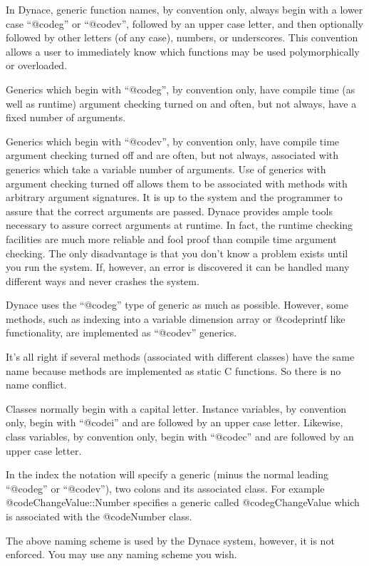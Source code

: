 In Dynace, generic function names, by convention only, always begin with
a lower case ``@code{g}'' or ``@code{v}'', followed by an upper case
letter, and then optionally followed by other letters (of any case),
numbers, or underscores.  This convention allows a user to immediately
know which functions may be used polymorphically or overloaded.

Generics which begin with ``@code{g}'', by convention only, have compile
time (as well as runtime) argument checking turned on and often, but not
always, have a fixed number of arguments.

Generics which begin with ``@code{v}'', by convention only, have compile
time argument checking turned off and are often, but not always,
associated with generics which take a variable number of arguments.  Use
of generics with argument checking turned off allows them to be
associated with methods with arbitrary argument signatures.  It is up to
the system and the programmer to assure that the correct arguments are
passed.  Dynace provides ample tools necessary to assure correct
arguments at runtime.  In fact, the runtime checking facilities are much
more reliable and fool proof than compile time argument checking.  The
only disadvantage is that you don't know a problem exists until you run
the system.  If, however, an error is discovered it can be handled many
different ways and never crashes the system.

Dynace uses the ``@code{g}'' type of generic as much as possible.
However, some methods, such as indexing into a variable dimension
array or @code{printf} like functionality, are implemented as
``@code{v}'' generics.


It's all right if several methods (associated with different classes)
have the same name because methods are implemented as static C
functions.  So there is no name conflict.

Classes normally begin with a capital letter.  Instance variables, by
convention only, begin with ``@code{i}'' and are followed by an
upper case letter.  Likewise, class variables, by convention only, begin
with ``@code{c}'' and are followed by an upper case letter.

In the index the notation will specify a generic (minus the normal
leading ``@code{g}'' or ``@code{v}''), two colons and its associated
class.  For example @code{ChangeValue::Number} specifies a generic
called @code{gChangeValue} which is associated with the @code{Number}
class.

The above naming scheme is used by the Dynace system, however, it
is not enforced.  You may use any naming scheme you wish.

